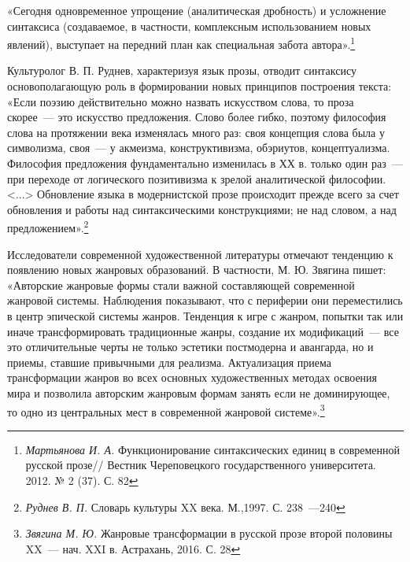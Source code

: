 \documentclass{kursa4}
\begin{document}
    {«Сегодня одновременное упрощение (аналитическая дробность) и усложнение синтаксиса (создаваемое, в частности, комплексным использованием новых явлений), выступает на передний план как специальная забота автора».}\footnote{\textit{Мартьянова И. А. }Функционирование синтаксических единиц в современной русской прозе// Вестник Череповецкого государственного университета. 2012. № 2 (37). С. 82}

    {Культуролог В. П. Руднев, характеризуя язык прозы, отводит синтаксису основополагающую роль в формировании новых принципов построения текста: «Если поэзию действительно можно назвать искусством слова, то проза скорее~--- это искусство предложения. Слово более гибко, поэтому философия слова на протяжении века изменялась
    много раз: своя концепция слова была у символизма, своя~--- у акмеизма, конструктивизма, обэриутов, концептуализма. Философия предложения фундаментально изменилась в ХХ в. только один раз~--- при переходе от
    логического позитивизма к зрелой аналитической философии.
    \textless{}...\textgreater{} Обновление языка в модернистской прозе
    происходит прежде всего за счет обновления и работы над
    синтаксическими конструкциями; не над словом, а над
    предложением».}\footnote{\textit{Руднев В. П.} Словарь культуры XX века. М.,1997. С. 238~---240}

    Исследователи современной художественной литературы отмечают тенденцию к появлению новых жанровых образований. В частности, М. Ю. Звягина пишет: «Авторские жанровые формы стали важной составляющей современной жанровой системы. Наблюдения показывают, что с периферии они переместились в центр эпической системы жанров. Тенденция к игре с жанром, попытки так или иначе трансформировать традиционные жанры, создание их модификаций~--- все это отличительные черты не только эстетики постмодерна и авангарда, но и приемы, ставшие привычными для реализма. Актуализация приема трансформации жанров во всех основных художественных методах освоения мира и позволила авторским жанровым формам занять если не доминирующее, то одно из центральных мест в современной жанровой системе».\footnote{\textit{Звягина М. Ю. }{Жанровые трансформации в русской прозе второй половины XX~--- нач. XXI в. Астрахань, 2016. С. 28}}
\end{document}
